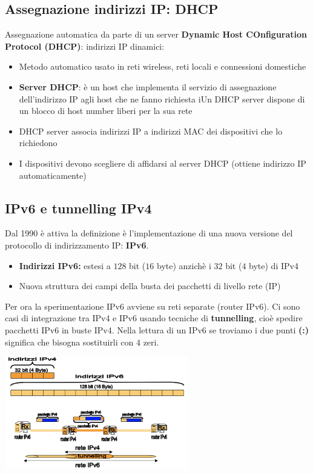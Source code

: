 \documentclass{article}
\begin{document}
\subsection{Assegnazione indirizzi IP: DHCP}
Assegnazione automatica da parte di un server \textbf{Dynamic Host COnfiguration Protocol (DHCP)}: indirizzi IP dinamici:
\begin{itemize}
    \item Metodo automatico usato in reti wireless, reti locali e connessioni domestiche
    \item \textbf{Server DHCP}: è un host che implementa il servizio di assegnazione dell'indirizzo IP agli host che ne fanno richiesta
    i\mte Un DHCP server dispone di un blocco di host number liberi per la sua rete
    \item DHCP server associa indirizzi IP a indirizzi MAC dei dispositivi che lo richiedono 
    \item I dispositivi devono scegliere di affidarsi al server DHCP (ottiene indirizzo IP automaticamente)
\end{itemize}
\subsection{IPv6 e tunnelling IPv4}
Dal 1990 è attiva la definizione è l'implementazione di una nuova versione del protocollo di indirizzamento IP: \textbf{IPv6}.
\begin{itemize}
    \item \textbf{Indirizzi IPv6:} estesi a $128$ bit ($16$ byte) anzichè i $32$ bit ($4$ byte) di IPv4
    \item Nuova struttura dei campi della busta dei pacchetti di livello rete (IP)
\end{itemize}
Per ora la sperimentazione IPv6 avviene su reti separate (router IPv6). Ci sono casi di integrazione tra IPv4 e IPv6 usando tecniche di \textbf{tunnelling}, cioè spedire pacchetti IPv6 in buste IPv4. Nella lettura di un IPv6 se troviamo i due punti \textbf{(:)} significa che bisogna sostituirli con $4$ zeri.
\begin{center}
    \includegraphics[width=8cm]{img/ipv6.png}
\end{center}
\newpage
\end{document}
